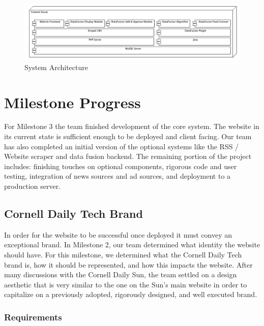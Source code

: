 \documentclass[12pt]{article} %
\begin{document}
\begin{figure}[htbp]
\begin{center}
\includegraphics[width=6in]{images/software_stack}
\caption{System Architecture}
\end{center}
\end{figure}


\section{Milestone Progress}

For Milestone 3 the team finished development of the core system. The website in its current state is sufficient enough to be deployed and client facing. Our team has also completed an initial version of the optional systems like the RSS / Website scraper and data fusion backend. The remaining portion of the project includes: finishing touches on optional components, rigorous code and user testing, integration of news sources and ad sources, and deployment to a production server.

\subsection{Cornell Daily Tech Brand}

In order for the website to be successful once deployed it must convey an exceptional brand. In Milestone 2, our team determined what identity the website should have. For this milestone, we determined what the Cornell Daily Tech brand is, how it should be represented, and how this impacts the website. After many discussions with the Cornell Daily Sun, the team settled on a design aesthetic that is very similar to the one on the Sun’s main website in order to capitalize on a previously adopted, rigorously designed, and well executed brand.


\subsubsection{Requirements}
\end{document}
